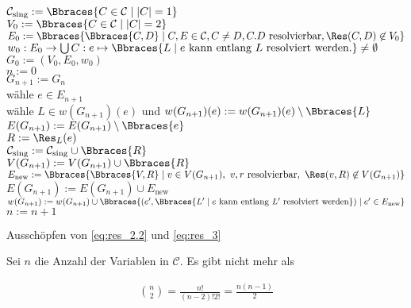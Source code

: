 \begin{solution}
\begin{algorithm}[H]
    $\mathcal C_\text{sing} := \Bbraces{C \in \mathcal C \mid |C| = 1}$ \\
    $V_0 := \Bbraces{C \in \mathcal C \mid |C| = 2}$ \\
    $E_0 := \Bbraces{\Bbraces{C, D} \mid C, E \in \mathcal C, C \neq D, C. D ~\text{resolvierbar}, \Res(C, D) \not \in V_0}$ \\
    $w_0: E_0 \to \bigcup C: e \mapsto \Bbraces{L \mid e ~\text{kann entlang}~ L ~\text{resolviert werden.}} \neq \emptyset$ \\
    $G_0 := (V_0, E_0, w_0)$ \\
    $n := 0$ \\
    {
        $G_{n+1} := G_n$ \\
        wähle $e \in E_{n+1}$ \\
        wähle $L \in w(G_{n+1})(e)$ und $w(G_{n+1})(e) := w(G_{n+1})(e) \setminus \Bbraces{L}$ \\
        {
            $E(G_{n+1}) := E(G_{n+1}) \setminus \Bbraces{e}$ \\
        }
        $R := \Res_L(e)$ \\
        {
            $\mathcal C_\text{sing} := \mathcal C_\text{sing} \cup \Bbraces{R}$ \\
        }{
            $V(G_{n+1}) := V(G_{n+1}) \cup \Bbraces{R}$ \\
            $E_\text{new} := \Bbraces{\Bbraces{V, R} \mid v \in V(G_{n+1}), ~ v, r ~\text{resolvierbar}, ~ \Res(v, R) \not \in V(G_{n+1})}$ \\
            $E(G_{n+1}) := E(G_{n+1}) \cup E_\text{new}$ \\
            $w(G_{n+1}) := w(G_{n+1}) \cup \Bbraces{(e^\prime, \Bbraces{L^\prime \mid e ~\text{kann entlang}~ L^\prime ~\text{resolviert werden}}) \mid e^\prime \in E_\text{new}}$ \\
        }
        $n := n + 1$ \\
    }
    \caption
    {
        Ausschöpfen von \eqref{eq:res_2.2} und \eqref{eq:res_3}
    }
\end{algorithm}

Sei $n$ die Anzahl der Variablen in $\mathcal C$.
Es gibt nicht mehr als

\begin{align*}
    \binom{n}{2}
    =
    \frac{n!}{(n-2)! 2!}
    =
    \frac{n (n-1)}{2}
\end{align*}


\end{solution}
